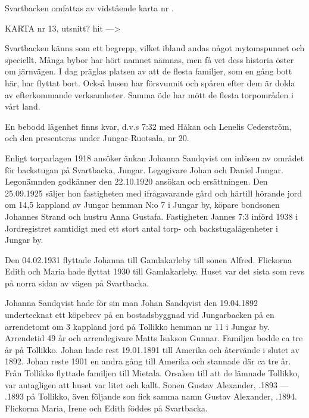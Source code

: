 %

Svartbacken omfattas av vidstående karta nr .


KARTA nr 13, utsnitt? hit --->


%



Svartbacken känns som ett begrepp, vilket ibland andas något mytomspunnet och speciellt. Många bybor har hört namnet nämnas, men få vet dess historia öster om järnvägen. I dag präglas platsen av att de flesta familjer, som en gång bott här, har flyttat bort. Också husen har försvunnit och spåren efter dem är dolda av efterkommande verksamheter. Samma öde har mött de flesta torpområden i vårt land.

En bebodd lägenhet finns kvar, d.v.s  7:32 med Håkan och Lenelis Cederström, och den presenteras under Jungar-Ruotsala, nr 20.



%


%
Enligt torparlagen 1918 ansöker änkan Johanna Sandqvist om inlösen av området för backstugan på Svartbacka, Jungar. Legogivare Johan och Daniel Jungar. Legonämnden godkänner den 22.10.1920 ansökan och ersättningen. Den 25.09.1925 säljer hon fastigheten med ifrågavarande gård och härtill hörande jord om 14,5 kappland av Jungar hemman N:o 7 i Jungar by, köpare  bondsonen Johannes Strand och hustru Anna Gustafa. Fastigheten Jannes 7:3 införd 1938 i Jordregistret samtidigt med ett stort antal torp- och backstugalägenheter i Jungar by.

Den 04.02.1931 flyttade Johanna till Gamlakarleby till sonen Alfred. Flickorna Edith och Maria hade flyttat 1930 till Gamlakarleby. Huset var det sista som revs på norra sidan av vägen på Svartbacka.

Johanna Sandqvist hade för sin man Johan Sandqvist den 19.04.1892	undertecknat ett köpebrev på en bostadsbyggnad vid Jungarbacken på en arrendetomt om 3 kappland jord på Tollikko	hemman nr 11 i Jungar by. Arrendetid 49 år och arrendegivare Matts	Isakson Gunnar. Familjen bodde ca tre år på Tollikko. Johan hade rest	19.01.1891 till Amerika och återvände i slutet av 1892. Johan reste 1901 en andra gång till Amerika och stannade där ca tre år. Från Tollikko flyttade familjen till Mietala. Orsaken till att de lämnade Tollikko, var antagligen att huset var litet och kallt. Sonen Gustav Alexander, .1893  ---  .1893 på Tollikko, även följande son fick samma namn Gustav Alexander, .1894. Flickorna Maria, Irene och 	Edith föddes på Svartbacka.

